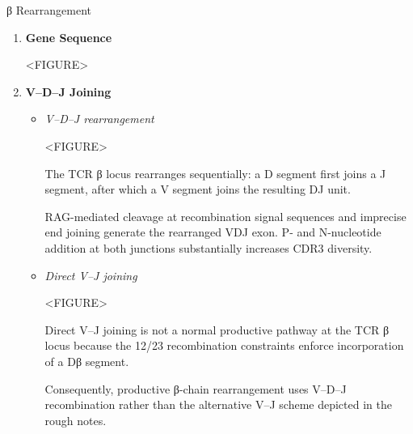       \begin{core}{β Rearrangement}

        \begin{enumerate}[label=(\arabic*)]

          \item \textbf{Gene Sequence}

            <FIGURE>

          \item \textbf{V--D--J Joining}

            \begin{itemize}

              \item \textit{V--D--J rearrangement}

                <FIGURE>

                The TCR β locus rearranges sequentially: a D segment first joins a J segment, after which a V segment joins the resulting DJ unit.

                RAG-mediated cleavage at recombination signal sequences and imprecise end joining generate the rearranged VDJ exon. P- and N-nucleotide addition at both junctions substantially increases CDR3 diversity.

              \item \textit{Direct V--J joining}

                <FIGURE>

                Direct V--J joining is not a normal productive pathway at the TCR β locus because the 12/23 recombination constraints enforce incorporation of a Dβ segment.

                Consequently, productive β-chain rearrangement uses V--D--J recombination rather than the alternative V--J scheme depicted in the rough notes.


\end{itemize}
\end{enumerate}
\end{core}
